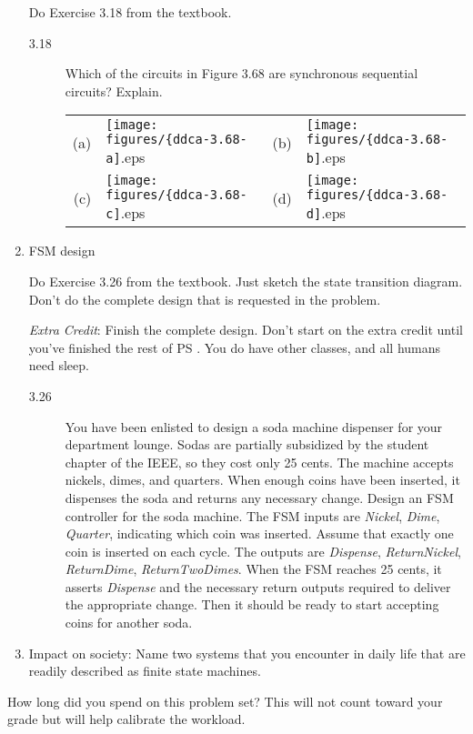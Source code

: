 \documentclass{ps}
\begin{document}
\begin{enumerate}
  Do Exercise 3.18 from the textbook.
  \begin{description}
  \item[3.18] Which of the circuits in Figure 3.68 are synchronous
    sequential circuits?  Explain.
    \begin{center}
      \begin{tabu}{rl@{\qquad}rl}
        (a)&\texttt{[image: figures/\{ddca-3.68-a]}.eps}&
        (b)&\texttt{[image: figures/\{ddca-3.68-b]}.eps}\\[1em]
        (c)&\texttt{[image: figures/\{ddca-3.68-c]}.eps}&
        (d)&\texttt{[image: figures/\{ddca-3.68-d]}.eps}
      \end{tabu}
    \end{center}
    \begin{solution}
    \end{solution}
  \end{description}

\item FSM design

  Do Exercise 3.26 from the textbook.  Just sketch the state
  transition diagram.  Don't do the complete design that is requested
  in the problem.

  \textit{Extra Credit}: Finish the complete design.  Don't start on
  the extra credit until you've finished the rest of PS \theps.  You
  do have other classes, and all humans need sleep.
  \begin{description}
  \item[3.26] You have been enlisted to design a soda machine
    dispenser for your department lounge.  Sodas are partially
    subsidized by the student chapter of the IEEE, so they cost only
    25 cents.  The machine accepts nickels, dimes, and quarters.  When
    enough coins have been inserted, it dispenses the soda and returns
    any necessary change.  Design an FSM controller for the soda
    machine.  The FSM inputs are \textit{Nickel}, \textit{Dime},
    \textit{Quarter}, indicating which coin was inserted.  Assume that
    exactly one coin is inserted on each cycle.  The outputs are
    \textit{Dispense}, \textit{ReturnNickel}, \textit{ReturnDime},
    \textit{ReturnTwoDimes}.  When the FSM reaches 25 cents, it
    asserts \textit{Dispense} and the necessary return outputs
    required to deliver the appropriate change.  Then it should be
    ready to start accepting coins for another soda.
    \begin{solution}
    \end{solution}
  \end{description}

\item Impact on society: Name two systems that you encounter in daily
  life that are readily described as finite state machines.
  \begin{solution}
  \end{solution}
\end{enumerate}

How long did you spend on this problem set?  This will not count
toward your grade but will help calibrate the workload.
\begin{solution}
\end{solution}
\end{document}
